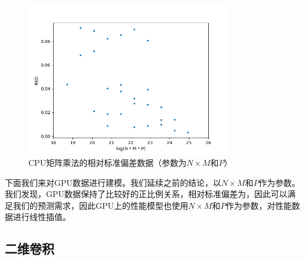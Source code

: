     \begin{figure}[!htbp]
        \centering
        \includegraphics[width=0.8\textwidth]{figures/matmul_cpu_nm_p_rsd.png}
        \caption{CPU矩阵乘法的相对标准偏差数据（参数为$ N \times M $和$ P $）}
        \label{fig:matmul_cpu_nm_p_rsd}
    \end{figure}

    下面我们来对GPU数据进行建模。我们延续之前的结论，以$ N \times M $和$ P $作为参数。我们发现，GPU数据保持了比较好的正比例关系，相对标准偏差为，因此可以满足我们的预测需求，因此GPU上的性能模型也使用$ N \times M $和$ P $作为参数，对性能数据进行线性插值。

\subsection{二维卷积}